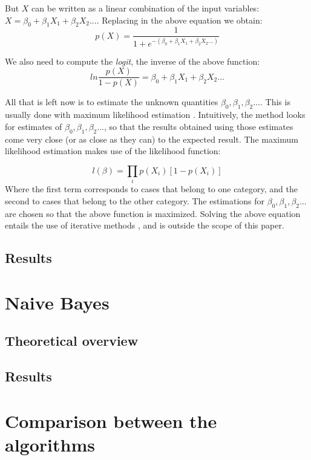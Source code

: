 But $X$ can be written as a linear combination of the input variables: $X = \beta_0 + \beta_1X_1 + \beta_2X_2 ...$. Replacing in the above equation we obtain:
\begin{equation*}
p(X) = \frac{1}{1+e^{-(\beta_0 + \beta_1X_1 + \beta_2X_2 ...)}}
\end{equation*}

We also need to compute the \textit{logit}, the inverse of the above function:
\begin{equation*}
ln\frac{p(X)}{1 - p(X)} = \beta_0 + \beta_1X_1 + \beta_2X_2 ...
\end{equation*}

All that is left now is to estimate the unknown quantities $\beta_0, \beta_1, \beta_2...$. This is usually done with maximum likelihood estimation \cite{menard2009logistic}. Intuitively, the method looks for estimates of $\beta_0, \beta_1, \beta_2...$, so that the results obtained using those estimates come very close (or as close as they can) to the expected result. The maximum likelihood estimation makes use of the likelihood function:

\begin{equation*}
l(\beta) = \prod_ip(X_i)[1 - p(X_i)]
\end{equation*} 
Where the first term corresponds to cases that belong to one category, and the second to cases that belong to the other category. The estimations for $\beta_0, \beta_1, \beta_2...$ are chosen so that the above function is maximized. Solving the above equation entails the use of iterative methods \cite{logmodel}, and is outside the scope of this paper.
 
\subsection{Results}


\section{Naive Bayes}

\subsection{Theoretical overview}

\subsection{Results}

\section {Comparison between the algorithms}